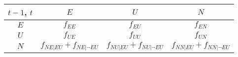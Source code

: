 \begin{tabular}{c|c|c|c}
  \hline \hline
  $t-1$, $t$ & $E$      & $U$      & $N$      \\ \hline
  $E$        & $f_{EE}$ & $f_{EU}$ & $f_{EN}$ \\ \hline
  $U$        & $f_{UE}$ & $f_{UU}$ & $f_{UN}$ \\ \hline
  $N$        & $f_{NE|EU} + f_{NE|\neg EU}$
             & $f_{NU|EU} + f_{NU|\neg EU}$
             & $f_{NN|EU} + f_{NN|\neg EU}$
             \\ \hline \hline
\end{tabular}

